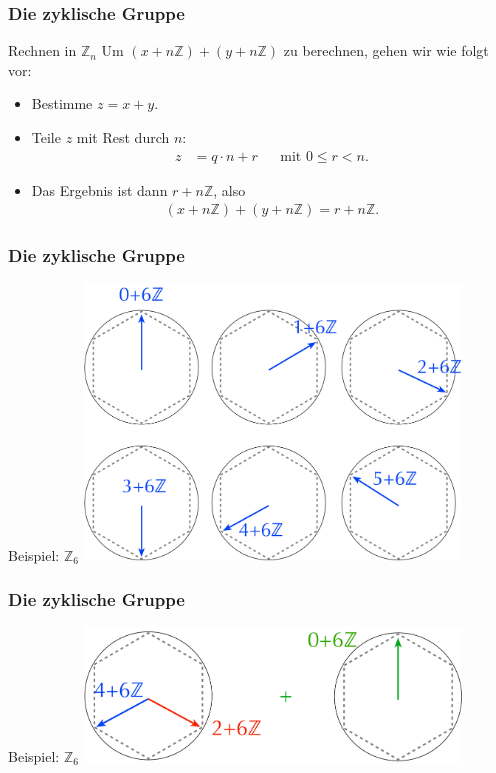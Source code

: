 \documentclass{beamer}
\newcommand\ZZ{\mathbb Z}
\begin{document}
\begin{frame}\frametitle{Die zyklische Gruppe}
	\begin{block}{Rechnen in $\ZZ_n$}
		Um $(x+n\ZZ)+(y+n\ZZ)$ zu berechnen, gehen wir wie folgt vor:
		\begin{itemize}
			\item Bestimme $z=x+y$.
			\item Teile $z$ mit Rest durch $n$:
				\begin{align*}
					z&=q\cdot n+r&&\mbox{mit }0\leq r<n.
				\end{align*}
			\item Das Ergebnis ist dann $r+n\ZZ$, also
				\begin{align*}
					(x+n\ZZ)+(y+n\ZZ)=r+n\ZZ.
				\end{align*}
		\end{itemize}	
	\end{block}
\end{frame}

\begin{frame}\frametitle{Die zyklische Gruppe}
	\begin{block}{Beispiel: $\ZZ_6$}
		\centering\includegraphics[width=100mm]{pics/cyclicGroup.pdf}
	\end{block}
\end{frame}

\begin{frame}\frametitle{Die zyklische Gruppe}
	\begin{block}{Beispiel: $\ZZ_6$}
		\centering\includegraphics[width=100mm]{pics/cyclicGroup1.pdf}
	\end{block}
\end{frame}
\end{document}
